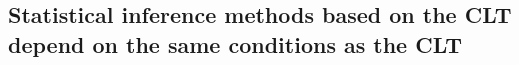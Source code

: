 \documentclass[slidestop,compress,mathserif,12pt,t,professionalfonts,xcolor=table]{beamer}
\newcommand{\solnMult}[1]{
\only<1>{#1}
\only<2->{\red{\textbf{#1}}}
}
\begin{document}
%
%
%
%
%
%
%
%
%
%
%
%
%
%
%
%
%
%
%
%
%

\subsection{Statistical inference methods based on the CLT depend on the same conditions as the CLT}
\label{mi4}
\end{document}
